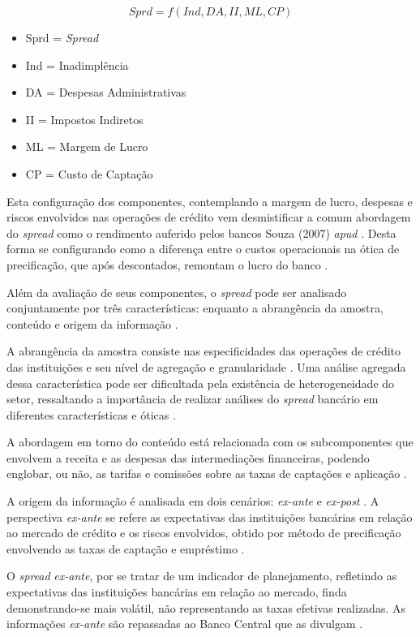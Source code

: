 \documentclass[12pt,openright,oneside,a4paper,chapter=TITLE,section=TITLE,subsection=TITLE,english,french,spanish,portugues,sumario=tradicional]{04-class-files/abntex2}
\providecommand{\tightlist}{%
  \setlength{\itemsep}{0pt}\setlength{\parskip}{0pt}}
\begin{document}
\[
Sprd=f(Ind, DA, II, ML, CP)
\]

\begin{itemize}
\tightlist
\item
  Sprd = \emph{Spread}
\item
  Ind = Inadimplência
\item
  DA = Despesas Administrativas
\item
  II = Impostos Indiretos
\item
  ML = Margem de Lucro
\item
  CP = Custo de Captação
\end{itemize}

Esta configuração dos componentes, contemplando a margem de lucro, despesas e
riscos envolvidos nas operações de crédito vem desmistificar a comum abordagem
do \emph{spread} como o rendimento auferido pelos bancos \cite{costa;nakane:2004}
Souza (2007) \emph{apud} \cite{dantas:2012}. Desta forma se configurando como a
diferença entre o custos operacionais na ótica de precificação, que após
descontados, remontam o lucro do banco \cite{BCB:2016}.

Além da avaliação de seus componentes, o \emph{spread} pode ser analisado
conjuntamente por três características: enquanto a abrangência da amostra,
conteúdo e origem da informação \cite{leal:2006}.

A abrangência da amostra consiste nas especificidades das operações de crédito
das instituições e seu nível de agregação e granularidade
\cite{costa;nakane:2004}. Uma análise agregada dessa característica pode ser
dificultada pela existência de heterogeneidade do setor, ressaltando a
importância de realizar análises do \emph{spread} bancário em diferentes
características e óticas \cite{block:2000}.

A abordagem em torno do conteúdo está relacionada com os subcomponentes que
envolvem a receita e as despesas das intermediações financeiras, podendo
englobar, ou não, as tarifas e comissões sobre as taxas de captações e
aplicação \cite{block:2000}.

A origem da informação é analisada em dois cenários: \emph{ex-ante} e \emph{ex-post}
\cite{kunt:1999, levine:1997}. A perspectiva \emph{ex-ante} se refere as
expectativas das instituições bancárias em relação ao mercado de crédito e os
riscos envolvidos, obtido por método de precificação envolvendo as taxas de
captação e empréstimo \cite{durigan:2018, leal:2006, dantas:2012}.

O \emph{spread} \emph{ex-ante}, por se tratar de um indicador de planejamento, refletindo
as expectativas das instituições bancárias em relação ao mercado, finda
demonstrando-se mais volátil, não representando as taxas efetivas realizadas.
As informações \emph{ex-ante} são repassadas ao Banco Central que as divulgam
\cite{durigan:2018, leal:2006, dantas:2012}.
\end{document}
